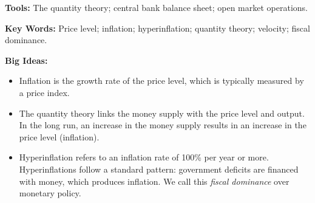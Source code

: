 \textbf{Tools:} The quantity theory; central bank balance sheet; open market operations.

\textbf{Key Words:} Price level; inflation; hyperinflation; quantity theory; velocity; fiscal dominance.

\textbf{Big Ideas:}
\begin{itemize}
    \item Inflation is the growth rate of the price level, which is typically measured by a price index.
    \item The quantity theory links the money supply with the price level and output. In the long run, an increase in the money supply results in an increase in the price level (inflation).
    \item Hyperinflation refers to an inflation rate of 100\% per year or more.
    Hyperinflations follow a standard pattern: government deficits are financed with money, which produces inflation.
        We call this {\it fiscal dominance\/} over monetary policy.
\end{itemize}

